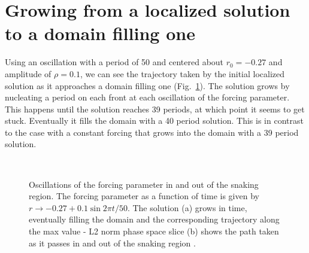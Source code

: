 \documentclass[pre,preprint,superscriptaddress]{revtex4-1}
\begin{document}
\section{Growing from a localized solution to a domain filling one}
 
Using an oscillation with a period of 50 and centered about $r_0=-0.27$ and amplitude of $\rho =0.1$, we can see the trajectory taken by the initial localized solution as it approaches a domain filling one (Fig.~\ref{fig:FillDomain}).  The solution grows by nucleating a period on each front at each oscillation of the forcing parameter. This happens until the solution reaches 39 periods, at which point it seems to get stuck.  Eventually it fills the domain with a 40 period solution.  This is in contrast to the case with a constant forcing that grows into the domain with a 39 period solution.  

\begin{figure}[h]
  \begin{center}
    \mbox{
       \quad
      }
    \caption{Oscillations of the forcing parameter in and out of the snaking region.  The forcing parameter as a function of time is given by $r\rightarrow -0.27+ 0.1\sin2\pi t/50$.  The solution (a) grows in time, eventually filling the domain and the corresponding trajectory along the max value - L2 norm phase space slice (b) shows the path taken as it passes in and out of the snaking region . }
    \label{fig:FillDomain}
  \end{center}
\end{figure} 









\end{document}
